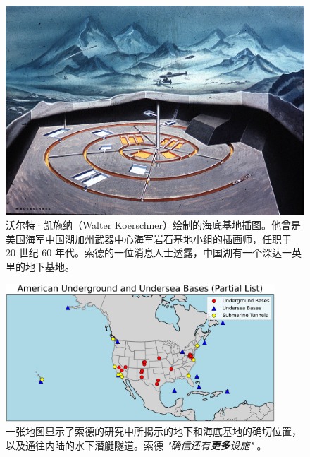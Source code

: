 \documentclass[10pt,twocolumn,letterpaper]{article}
\begin{document}
\begin{figure}[t]
\begin{center}
   \includegraphics[width=1\linewidth]{undersea.jpg}
\end{center}
   \caption{沃尔特·凯施纳（Walter Koerschner）绘制的海底基地插图。他曾是美国海军中国湖加州武器中心海军岩石基地小组的插画师，任职于 20 世纪 60 年代。索德的一位消息人士透露，中国湖有一个深达一英里的地下基地\cite{22,23}。}
\label{fig:5}
\label{fig:onecol}
\end{figure}

\begin{figure}[t]
\begin{center}
\includegraphics[width=0.9\textwidth]{basescrop.png}
\end{center}
   \caption{一张地图显示了索德的研究中所揭示的地下和海底基地的确切位置，以及通往内陆的水下潜艇隧道。索德 \textit{"确信还有\textbf{更多}设施"} \cite{22}。}
   \label{fig:4}
\end{figure}
\end{document}
